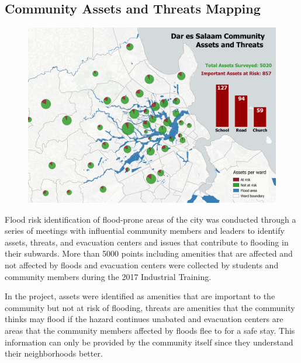 \documentclass[a4paper,12pt,twoside]{article}
\begin{document}
\newpage
\subsection{Community Assets and Threats Mapping}
\begin{figure}[h]
    \centering
    \includegraphics[width=.8\textwidth]{images/asset_pie_min.png}
    \label{fig:my_label}
\end{figure}

\begin{multicols}{2}
Flood risk identification of flood-prone areas of the city was conducted through a series of meetings with influential community members and leaders to identify assets, threats, and evacuation centers and issues that contribute to flooding in their subwards. More than 5000 points including amenities that are affected and not affected by floods and evacuation centers were collected by students and community members during the 2017 Industrial Training.

In the project, assets were identified as amenities that are important to the community but not at risk of flooding, threats are amenities that the community thinks may flood if the hazard continues unabated and evacuation centers are areas that the community members affected by floods flee to for a safe stay. This information can only be provided by the community itself since they understand their neighborhoods better.
\end{multicols}
\end{document}
